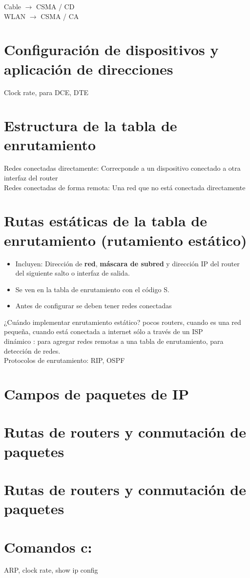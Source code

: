 \documentclass[letterpaper,12pt]{article}
\begin{document}
\begin{sloppypar}
Cable $\rightarrow$ CSMA / CD
\vspace{0.3cm}\\  
WLAN $\rightarrow$ CSMA / CA

\section{Configuración de dispositivos y aplicación de direcciones}
Clock rate, para DCE, DTE

\section{Estructura de la tabla de enrutamiento}
Redes conectadas directamente: Correcponde a un dispositivo conectado a otra interfaz del router
\vspace{0.3cm}\\ 
Redes conectadas de forma remota: Una red que no está conectada directamente 

\section{Rutas estáticas de la tabla de enrutamiento (rutamiento estático)}
\begin{itemize}
  \item Incluyen: Dirección de \textbf{red}, \textbf{máscara de subred} y dirección IP del router del siguiente salto o interfaz de salida.
  \item Se ven en la tabla de enrutamiento con el código S. 
  \item Antes de configurar se deben tener redes conectadas
\end{itemize}

¿Cuándo implementar enrutamiento estático? pocos routers, cuando es una red pequeña, cuando está conectada a internet sólo a través de un ISP
\vspace{0.3cm}\\ 
dinámico : para agregar redes remotas a una tabla de enrutamiento, para detección de redes.
\vspace{0.3cm}\\ 
Protocolos de enrutamiento: RIP, OSPF 

\section{Campos de paquetes de IP}
\section{Rutas de routers y conmutación de paquetes}
\section{Rutas de routers y conmutación de paquetes}
\section{Comandos c:}
ARP, clock rate, show ip config



\end{sloppypar}
\end{document}
